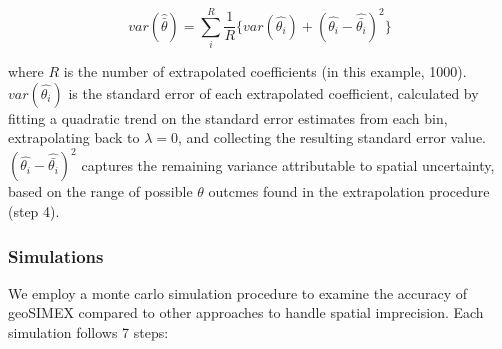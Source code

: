 \begin{equation}\label{variance}
var(\hat{\bar{\theta}}) = \sum_i^R \frac{1}{R} \{ var(\hat{\theta_i}) + (\hat{\theta_i}-\hat{\bar{\theta_i}})^2 \}
\end{equation}

\noindent where $R$ is the number of extrapolated coefficients (in this example, 1000). 
$var(\hat{\theta_i})$ is the standard error of each extrapolated coefficient, calculated by fitting a quadratic trend on the standard error estimates from each bin, extrapolating back to $\lambda=0$, and collecting the resulting standard error value. 
$(\hat{\theta_i}-\hat{\bar{\theta_i}})^2$ captures the remaining variance attributable to spatial uncertainty, based on the range of possible $\theta$ outcmes found in the extrapolation procedure (step 4).  

\subsubsection{Simulations}

We employ a monte carlo simulation procedure to examine the accuracy of geoSIMEX compared to other approaches to handle spatial imprecision. 
Each simulation follows 7 steps:

